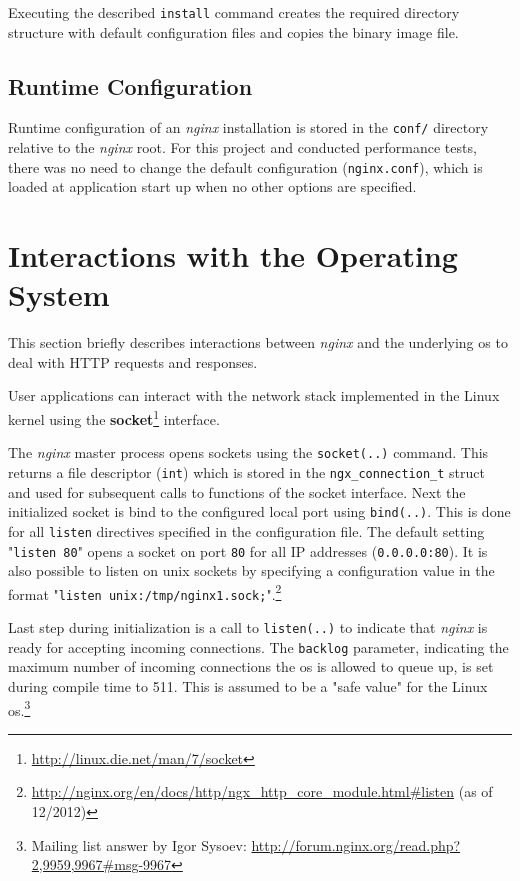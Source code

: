 Executing the described \texttt{install} command creates the required directory structure with default configuration files and copies the binary image file.
\\

\subsection{Runtime Configuration}

Runtime configuration of an \textit{nginx} installation is stored in the \texttt{conf/} directory relative to the \textit{nginx} root. For this project and conducted performance tests, there was no need to change the default configuration (\texttt{nginx.conf}), which is loaded at application start up when no other options are specified.
\\

\section{Interactions with the Operating System}
\label{sec:nginx-os-if}

This section briefly describes interactions between \textit{nginx} and the underlying \gls{os} to deal with HTTP requests and responses.

User applications can interact with the network stack implemented in the Linux kernel using the \textbf{socket}\footnote{\url{http://linux.die.net/man/7/socket}} interface.

The \textit{nginx} master process opens sockets using the \texttt{socket(..)} command. This returns a file descriptor (\texttt{int}) which is stored in the \texttt{ngx\_connection\_t} struct and used for subsequent calls to functions of the socket interface. Next the initialized socket is bind to the configured local port using \texttt{bind(..)}. This is done for all \texttt{listen} directives specified in the configuration file. The default setting "\texttt{listen 80}" opens a socket on port \texttt{80} for all IP addresses (\texttt{0.0.0.0:80}). It is also possible to listen on unix sockets by specifying a configuration value in the format "\texttt{listen unix:/tmp/nginx1.sock;}".\footnote{\url{http://nginx.org/en/docs/http/ngx\_http\_core\_module.html\#listen} (as of 12/2012)}

Last step during initialization is a call to \texttt{listen(..)} to indicate that \textit{nginx} is ready for accepting incoming connections. The \texttt{backlog} parameter, indicating the maximum number of incoming connections the \gls{os} is allowed to queue up, is set during compile time to 511. This is assumed to be a "safe value" for the Linux \gls{os}.\footnote{Mailing list answer by Igor Sysoev: \url{http://forum.nginx.org/read.php?2,9959,9967\#msg-9967}}


